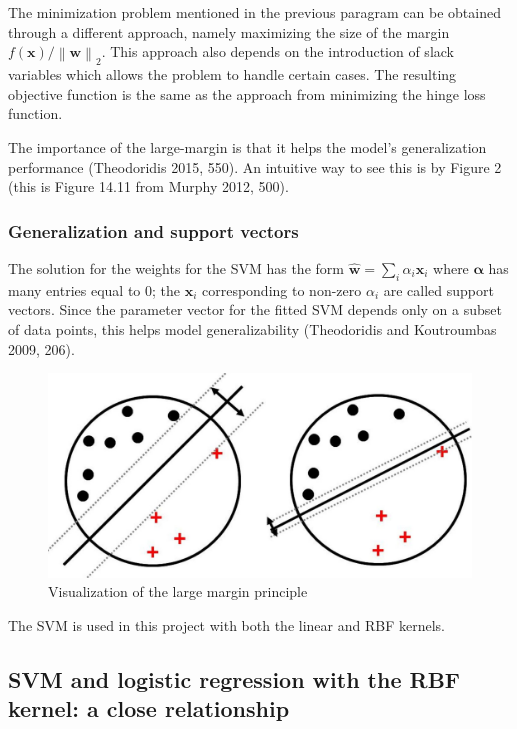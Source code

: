 \documentclass[letterpaper, 11pt]{article}
\newcommand{\norm}[1]{\left\lVert #1 \right\rVert}
\newcommand{\vect}[1]{\boldsymbol{#1}}
\begin{document}
The minimization problem mentioned in the previous paragram can be obtained through a different approach, namely maximizing the size of the margin $f(\vect{x}) / \norm{\vect{w}}_2$. This approach also depends on the introduction of slack variables which allows the problem to handle certain cases. The resulting objective function is the same as the approach from minimizing the hinge loss function.

The importance of the large-margin is that it helps the model's generalization performance (Theodoridis 2015, 550). An intuitive way to see this is by Figure 2 (this is Figure 14.11 from Murphy 2012, 500).

\subsubsection{Generalization and support vectors}

The solution for the weights for the SVM has the form $\widehat{\vect{w}} = \sum_i \alpha_i \vect{x}_i$ where $\vect{\alpha}$ has many entries equal to 0; the $\vect{x}_i$ corresponding to non-zero $\alpha_i$ are called support vectors. Since the parameter vector for the fitted SVM depends only on a subset of data points, this helps model generalizability (Theodoridis and Koutroumbas 2009, 206).

\begin{figure}[ht!]
\centering
\includegraphics[width=120mm]{largeMarginPrinciple2.jpg}
\caption{Visualization of the large margin principle \label{overflow}}
\end{figure}

The SVM is used in this project with both the linear and RBF kernels.

\subsection{SVM and logistic regression with the RBF kernel: a close relationship}
\end{document}
